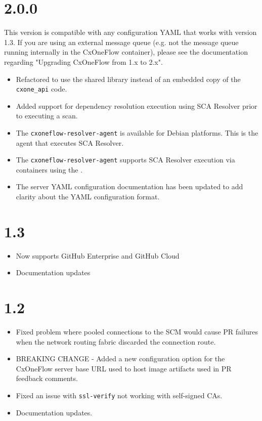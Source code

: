 \section{2.0.0}

This version is compatible with any configuration YAML that works with version 1.3.  If you are using an external message queue (e.g. not the
message queue running internally in the CxOneFlow container), please see the documentation regarding "Upgrading CxOneFlow from 1.x to 2.x".

\begin{itemize}
    \item Refactored to use the shared library \space instead
    of an embedded copy of the \texttt{cxone\_api} code.
    \item Added support for dependency resolution execution using SCA Resolver prior to executing a scan.
    \item The \texttt{cxoneflow-resolver-agent} is available for Debian platforms.  This is the agent that executes SCA Resolver.
    \item The \texttt{cxoneflow-resolver-agent} supports SCA Resolver execution via containers using the \toolkit.
    \item The server YAML configuration documentation has been updated to add clarity about the YAML configuration format.
\end{itemize}


\section{1.3}

\begin{itemize}
    \item Now supports GitHub Enterprise and GitHub Cloud
    \item Documentation updates
\end{itemize}

\section{1.2}

\begin{itemize}
    \item Fixed problem where pooled connections to the SCM would cause PR failures when the network routing 
    fabric discarded the connection route.
    \item BREAKING CHANGE - Added a new configuration option for the CxOneFlow server base URL used to host image
    artifacts used in PR feedback comments.
    \item Fixed an issue with \texttt{ssl-verify} not working with self-signed CAs.
    \item Documentation updates.
\end{itemize}



